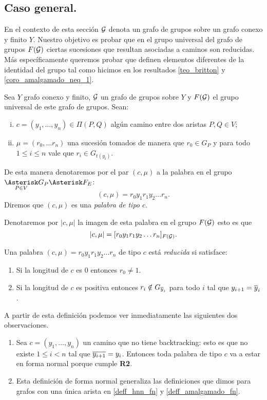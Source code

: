 \documentclass[tesis.tex]{subfiles}
\begin{document}
\subsection{ Caso general.}

En el contexto de esta sección ${\cal G}$ denota un grafo de grupos sobre un grafo conexo y finito $Y$.
Nuestro objetivo es probar que en el grupo universal del grafo de grupos $F({\cal G})$ ciertas sucesiones que resultan asociadas a caminos son reducidas.
Más específicamente queremos probar que definen elementos diferentes de la identidad del grupo tal como hicimos en los resultados \ref{teo_britton} y \ref{coro_amalgamado_neq_1}.



\begin{deff}
	Sea $Y$ grafo conexo y finito, ${\cal G}$ un grafo de grupos sobre $Y$ y $F({\cal G})$ el grupo universal de este grafo de grupos.
	Sean:
	\begin{enumerate}[i)]
		\item $c=(y_1, \dots, y_n) \in \Pi(P,Q)$ algún camino entre dos aristas $P,Q \in V$;
		\item $\mu = (r_0, \dots r_n)$ una sucesión tomados de manera que $r_0 \in G_P$ y para todo $ 1 \le i \le n $ vale que $r_i \in G_{t(y_i)}$.
	\end{enumerate}
	De esta manera denotaremos por el par $(c, \mu)$ a la palabra en el grupo $\underset{P \in V}{\Asterisk} G_P \Asterisk F_E$:
	\[
	(c,\mu) = r_0 y_1 r_1 y_2 \dots r_n.
	\]
	Diremos que $(c, \mu)$ es una \emph{palabra de tipo $c$}.
\end{deff}
 
Denotaremos por $|c,\mu|$ la imagen de esta palabra en el grupo $F({\cal G})$ esto es que
\[
|c,\mu| = [r_0 y_1 r_1 y_2 \dots r_n]_{F({\cal G})}.
\]

\begin{deff}
	Una palabra $(c, \mu)=r_0 y_1 r_1 y_2 \dots r_n$ de tipo $c$ está \emph{reducida} si satisface:
	\begin{enumerate}[R1.]
		\item Si la longitud de $c$ es $0$ entonces $r_0 \neq 1$.
		\item Si la longitud de $c$ es positiva entonces $r_i \notin G_{\overline y_{i}}$ para todo $i$ tal que $y_{i+1} = \overline y_{i}$.
	\end{enumerate}
\end{deff}
A partir de esta definición podemos ver inmediatamente las siguientes dos observaciones.
\begin{enumerate}[1.]
	\item Sea $c=(y_1, \dots, y_n)$ un camino que no tiene backtracking: esto es que no existe $1 \le i  < n$ tal que $\overline {y_{i+1}} = y_{i}$.
	Entonces toda palabra de tipo $c$ va a estar en forma normal porque cumple \textbf{R2}.
	
	\item Esta definición de forma normal generaliza las definiciones que dimos para grafos con una única arista en \ref{deff_hnn_fn} y \ref{deff_amalgamado_fn}.
\end{enumerate}
\end{document}
